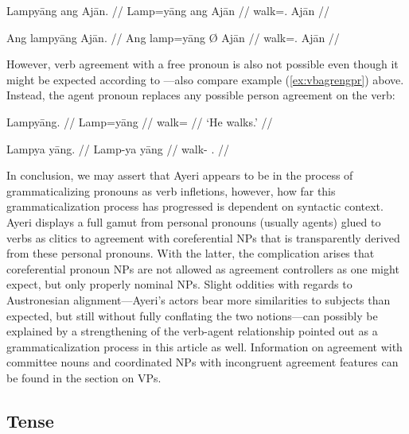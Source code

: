 \pex %
\a\ljudge* \begingl
	\gla Lampyāng ang Ajān. //
	\glb Lamp=yāng ang ​Ajān //
	\glc walk=\TsgM{}.\Aarg{} \Aarg{} Ajān //
\endgl

\a\ljudge* \begingl	
	\gla Ang lampyāng {} Ajān. //
	\glb Ang lamp=yāng Ø ​Ajān //
	\glc \AgtT{} walk=\TsgM{}.\Aarg{} \Top{} ​Ajān //
\endgl

\xe

However, verb agreement with a free pronoun is also not possible even though it
might be expected according to \citep[109]{corbett2006}---also compare example
(\ref{ex:vbagrengpr}) above. Instead, the agent pronoun replaces any possible
person agreement on the verb:

\pex %
\a\begingl
	\gla Lampyāng. //
	\glb Lamp=yāng //
	\glc walk=\TsgM{} //
	\glft `He walks.' //
\endgl

\a\ljudge* \begingl	
	\gla Lampya yāng. //
	\glb Lamp-ya yāng //
	\glc walk-\TsgM{} \TsgM{}.\Aarg{} //
\endgl

\xe

In conclusion, we may assert that Ayeri appears to be in the process of
grammaticalizing pronouns as verb infletions, however, how far this
grammaticalization process has progressed is dependent on syntactic context.
Ayeri displays a full gamut from personal pronouns (usually agents) glued to
verbs as clitics to agreement with coreferential NPs that is transparently
derived from these personal pronouns. With the latter, the complication arises
that coreferential pronoun NPs are not allowed as agreement controllers as one
might expect, but only properly nominal NPs. Slight oddities with regards to
Austronesian alignment---Ayeri's actors bear more similarities to subjects than
expected, but still without fully conflating the two notions---can possibly be
explained by a strengthening of the verb-agent relationship pointed out as a
grammaticalization process in this article as well. Information on agreement
with committee nouns and coordinated NPs with incongruent agreement features
can be found in the section on VPs.


\subsection{Tense}

